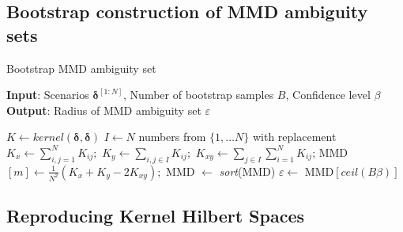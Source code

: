 \subsection{Bootstrap construction of MMD ambiguity sets}
\begin{algorithm}
	\caption{Bootstrap MMD ambiguity set}\label{alg:Bootstrap}
	\hspace*{\algorithmicindent} \textbf{Input}: Scenarios $ \boldsymbol{\delta}^{[1:N]} $, Number of bootstrap samples $B$, Confidence level $\beta$ \\
	\hspace*{\algorithmicindent} \textbf{Output}: Radius of MMD ambiguity set $\varepsilon$
	\begin{algorithmic}[1]
		\State $K \gets \textit{kernel}(\boldsymbol{\delta}, \boldsymbol{\delta})$
			\State $I \gets N$ numbers from $\{1, \dots N \}$ with replacement
			\State $K_x \gets \sum_{i,j = 1}^N K_{ij};$
			\State $K_y \gets \sum_{i,j \in I} K_{ij};$
			\State $K_{xy} \gets \sum_{j \in I} \sum_{i = 1}^N K_{ij}$;
			\State MMD$[m] \gets \frac{1}{N^2} \left( K_x + K_y - 2 K_{xy} \right) ;$
		\EndFor
		\State MMD $\gets$ \textit{sort}(MMD)
		\State $\varepsilon \gets$ MMD$\left[ \textit{ceil} (B \beta) \right]$
	\end{algorithmic}
\end{algorithm}

\subsection{Reproducing Kernel Hilbert Spaces}


